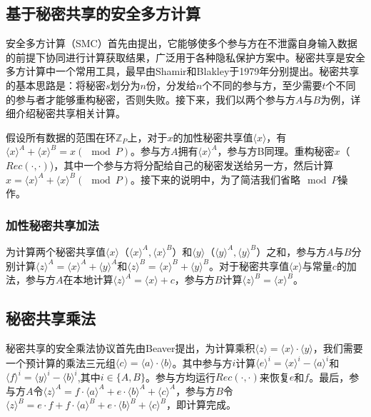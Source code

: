 \subsection{基于秘密共享的安全多方计算}
安全多方计算（SMC）首先由\cite{yao1986generate}提出，它能够使多个参与方在不泄露自身输入数据的前提下协同进行计算获取结果，广泛用于各种隐私保护方案中。秘密共享是安全多方计算中一个常用工具，最早由Shamir\cite{rivest2001leak}和Blakley\cite{blakley1979safeguarding}于1979年分别提出。秘密共享的基本思路是：将秘密$ s $划分为$ n $份，分发给$ n $个不同的参与方，至少需要$ t $个不同的参与者才能够重构秘密，否则失败。接下来，我们以两个参与方$ A $与$ B $为例，详细介绍秘密共享相关计算。

假设所有数据的范围在环$ \mathbb{Z}_P $上，对于$ x $的加性秘密共享值$ \langle x \rangle $，有$ \langle x \rangle^A + \langle x \rangle^B = x(\mod P)$。参与方$ A $拥有$ \langle x \rangle^A $，参与方B同理。重构秘密$ x $（$ Rec(\cdot, \cdot) $)，其中一个参与方将分配给自己的秘密发送给另一方，然后计算$ x=\langle x\rangle^A+\langle x\rangle^B(\mod P) $。接下来的说明中，为了简洁我们省略$ \mod P $操作。

\subsubsection{加性秘密共享加法}
为计算两个秘密共享值$ \langle x \rangle $（$ \langle x \rangle^A,\langle x \rangle^B $）和$ \langle y \rangle $（$ \langle y\rangle^A,\langle y\rangle^B $）之和，参与方$ A $与$ B $分别计算$\langle z\rangle^A=\langle x\rangle^A+\langle y\rangle^A$和$\langle z\rangle^B=\langle x\rangle^B+\langle y\rangle^B$。对于秘密共享值$ \langle x \rangle $与常量$ c $的加法，参与方$ A $在本地计算$\langle z\rangle^A=\langle x\rangle+c$，参与方$ B $计算$\langle z\rangle^B=\langle x\rangle^B$。
\subsection{秘密共享乘法}
秘密共享的安全乘法协议首先由Beaver\cite{beaver1992efficient}提出，为计算乘积$\langle z\rangle=\langle x\rangle \cdot\langle y\rangle$，我们需要一个预计算的乘法三元组$\langle c\rangle=\langle a\rangle \cdot\langle b\rangle$。其中参与方$ i $计算$ \langle e \rangle^i = \langle x \rangle^i - \langle a \rangle^i $和$\langle f\rangle^i=\langle y\rangle^i-\langle b\rangle^i$,其中$ i \in \{A, B\}$。参与方均运行$ Rec(\cdot, \cdot) $来恢复$ e $和$ f $。最后，参与方$ A $令$\langle z\rangle^A=f \cdot\langle a\rangle^A+e \cdot\langle b\rangle^A+\langle c\rangle^A$，参与方$ B $令$\langle z\rangle^B=e \cdot f+f \cdot\langle a\rangle^B+e \cdot\langle b\rangle^B+\langle c\rangle^B$，即计算完成。

